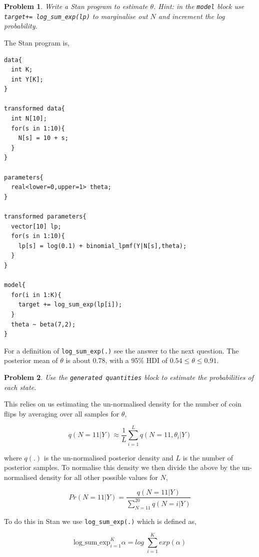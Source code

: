 \documentclass{article}
\newtheorem{problem}{Problem}[section]
\begin{document}
\begin{problem}
	Write a Stan program to estimate $\theta$. Hint: in the \texttt{model} block use \texttt{target+= log_sum_exp(lp)} to marginalise out $N$ and increment the log probability. 
\end{problem}

The Stan program is,

\begin{verbatim}
data{
  int K;
  int Y[K];
}

transformed data{
  int N[10];
  for(s in 1:10){
    N[s] = 10 + s;
  }
}

parameters{
  real<lower=0,upper=1> theta;
}

transformed parameters{
  vector[10] lp;
  for(s in 1:10){
    lp[s] = log(0.1) + binomial_lpmf(Y|N[s],theta);  
  }
}

model{
  for(i in 1:K){
    target += log_sum_exp(lp[i]);
  }
  theta ~ beta(7,2);
}
\end{verbatim}

For a definition of \texttt{log_sum_exp(.)} see the answer to the next question. The posterior mean of $\theta$ is about 0.78, with a 95\% HDI of $0.54\leq \theta \leq 0.91$.

\begin{problem}
	Use the \texttt{generated quantities} block to estimate the probabilities of each state.
\end{problem}

This relies on us estimating the un-normalised density for the number of coin flips by averaging over all samples for $\theta$,

\begin{equation}
q(N=11|Y) \approx \frac{1}{L} \sum_{i=1}^{L} q(N=11,\theta_i|Y)
\end{equation}

where $q(.)$ is the un-normalised posterior density and $L$ is the number of posterior samples. To normalise this density we then divide the above by the un-normalised density for all other possible values for $N$,

\begin{equation}
Pr(N=11|Y) = \frac{q(N=11|Y)}{\sum_{N=11}^{20} q(N=i|Y)}
\end{equation}

To do this in Stan we use  \texttt{log_sum_exp(.)} which is defined as,

\begin{equation}
\text{log\_sum\_exp}_{i=1}^{K} \alpha = log\; \sum_{i=1}^{K} exp(\alpha) 
\end{equation}
\end{document}
